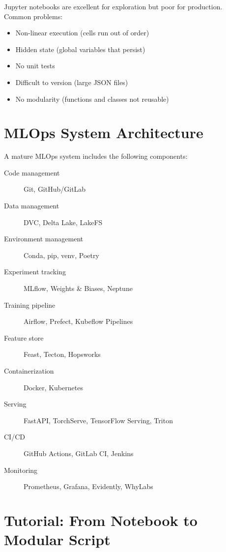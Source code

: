 \begin{warning}[title=\textbf{The notebook trap}]
Jupyter notebooks are excellent for exploration but poor for production.
Common problems:
\begin{itemize}
  \item Non-linear execution (cells run out of order)
  \item Hidden state (global variables that persist)
  \item No unit tests
  \item Difficult to version (large JSON files)
  \item No modularity (functions and classes not reusable)
\end{itemize}
\end{warning}

\section{MLOps System Architecture}
\label{sec:mlops-architecture}

A mature MLOps system includes the following components:

\begin{toolbox}[title=\textbf{MLOps system components}]
\begin{description}
  \item[Code management] Git, GitHub/GitLab
  \item[Data management] DVC, Delta Lake, LakeFS
  \item[Environment management] Conda, pip, venv, Poetry
  \item[Experiment tracking] MLflow, Weights \& Biases, Neptune
  \item[Training pipeline] Airflow, Prefect, Kubeflow Pipelines
  \item[Feature store] Feast, Tecton, Hopsworks
  \item[Containerization] Docker, Kubernetes
  \item[Serving] FastAPI, TorchServe, TensorFlow Serving, Triton
  \item[CI/CD] GitHub Actions, GitLab CI, Jenkins
  \item[Monitoring] Prometheus, Grafana, Evidently, WhyLabs
\end{description}
\end{toolbox}

\section{Tutorial: From Notebook to Modular Script}
\label{sec:notebook-to-script}

